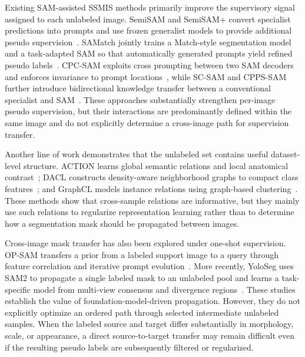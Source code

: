 \documentclass[a4paper,fleqn]{cas-dc}
\begin{document}
Existing SAM-assisted SSMIS methods primarily improve the supervisory signal assigned to each unlabeled image. SemiSAM and SemiSAM+ convert specialist predictions into prompts and use frozen generalist models to provide additional pseudo supervision~\cite{zhang2023semisam,zhang2025semisamplus}. SAMatch jointly trains a Match-style segmentation model and a task-adapted SAM so that automatically generated prompts yield refined pseudo labels~\cite{xu2024samatch}. CPC-SAM exploits cross prompting between two SAM decoders and enforces invariance to prompt locations~\cite{miao2024cpcsam}, while SC-SAM and CPPS-SAM further introduce bidirectional knowledge transfer between a conventional specialist and SAM~\cite{vu2026scsam,zhang2026cppssam}. These approaches substantially strengthen per-image pseudo supervision, but their interactions are predominantly defined within the same image and do not explicitly determine a cross-image path for supervision transfer.

Another line of work demonstrates that the unlabeled set contains useful dataset-level structure. ACTION learns global semantic relations and local anatomical contrast~\cite{you2022action}; DACL constructs density-aware neighborhood graphs to compact class features~\cite{tang2024dacl}; and GraphCL models instance relations using graph-based clustering~\cite{wang2024graphcl}. These methods show that cross-sample relations are informative, but they mainly use such relations to regularize representation learning rather than to determine how a segmentation mask should be propagated between images.

Cross-image mask transfer has also been explored under one-shot supervision. OP-SAM transfers a prior from a labeled support image to a query through feature correlation and iterative prompt evolution~\cite{mao2025opsam}. More recently, YoloSeg uses SAM2 to propagate a single labeled mask to an unlabeled pool and learns a task-specific model from multi-view consensus and divergence regions~\cite{zhang2026yoloseg}. These studies establish the value of foundation-model-driven propagation. However, they do not explicitly optimize an ordered path through selected intermediate unlabeled samples. When the labeled source and target differ substantially in morphology, scale, or appearance, a direct source-to-target transfer may remain difficult even if the resulting pseudo labels are subsequently filtered or regularized.
\end{document}
